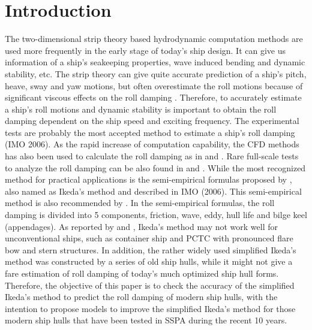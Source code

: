 \section{Introduction}
\label{se:introduction}

%    

The two-dimensional strip theory based hydrodynamic computation methods are used more frequently in the early stage of today's ship design. It can give us information of a ship's seakeeping properties, wave induced bending and dynamic stability, etc. The strip theory can give quite accurate prediction of a ship's pitch, heave, sway and yaw motions, but often overestimate the roll motions because of significant viscous effects on the roll damping \parencite{kawahara_simple_2011}. Therefore, to accurately estimate a ship's roll motions and dynamic stability is important to obtain the roll damping dependent on the ship speed and exciting frequency. The experimental tests are probably the most accepted method to estimate a ship's roll damping (IMO 2006). As the rapid increase of computation capability, the CFD methods has also been used to calculate the roll damping as in \parencite{kristiansen_experimental_2014} and \parencite{henry_peter_piehl_ship_2016}. Rare full-scale tests to analyze the roll damping can be also found in \parencite{schmitke_ship_1978} and \parencite{soder_assessment_2019}. While the most recognized method for practical applications is the semi-empirical formulas proposed by  \parencite{ikeda_eddy_1978,ikeda_components_1978,ikeda_roll_1979,ikeda_velocity_1979}, also named as Ikeda's method and described in IMO (2006). This semi-empirical method is also recommended by \parencite{ittc_ittc_2011}. In the semi-empirical formulas, the roll damping is divided into 5 components, friction, wave, eddy, hull life and bilge keel (appendages). As reported by  \parencite{kawahara_simple_2011} and \parencite{soder_ikeda_2019}, Ikeda's method may not work well for unconventional ships, such as container ship and PCTC with pronounced flare bow and stern structures. In addition, the rather widely used simplified Ikeda's method \parencite{kawahara_simple_2011} was constructed by a series of old ship hulls, while it might not give a fare estimation of roll damping of today's much optimized ship hull forms. 
Therefore, the objective of this paper is to check the accuracy of the simplified Ikeda's method to predict the roll damping of modern ship hulls, with the intention to propose models to improve the simplified Ikeda's method for those modern ship hulls that have been tested in SSPA during the recent 10 years.

